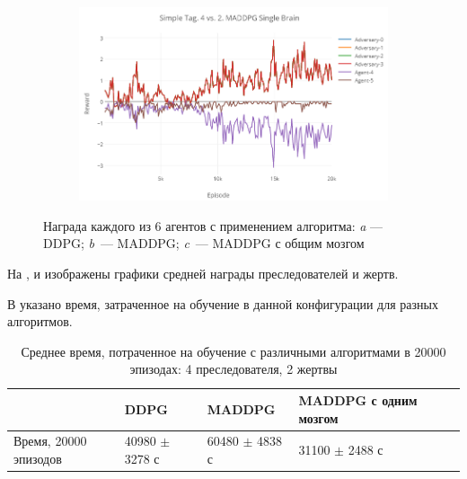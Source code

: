 \begin{figure}[!htbp]
    \begin{subfigure}[t]{\dimexpr.5\linewidth-1.3em\relax}%
        \includegraphics[height=0.20\textheight,valign=t]{my_folder/images/ch5/st-4vs2-maddpg-sb.png}%
    \end{subfigure}
    \captionsetup{justification=centering} %
    \caption{Награда каждого из 6 агентов с применением алгоритма: {\itshape a} --- DDPG; {\itshape b}~--- MADDPG; {\itshape c}~--- MADDPG с общим мозгом}\label{fig:spbpu_main_bld-two-photos}
\end{figure}

На ,  и  изображены графики средней награды преследователей и жертв.

В  указано время, затраченное на обучение в данной конфигурации для разных алгоритмов.

\begin{table}[t!]
    \centering\small
    \caption{Среднее время, потраченное на обучение с различными алгоритмами в 20000 эпизодах: 4 преследователя, 2 жертвы}
    \label{tab-st-4vs2-time}
    \begin{tabular}{|l|l|l|l|l|l|}
        \hline
        & DDPG        & MADDPG      & MADDPG с одним мозгом \\
        \hline
        Время, 20000 эпизодов & 40980 $\pm$ 3278 с & 60480 $\pm$ 4838 с & 31100 $\pm$ 2488 с \\ \hline
    \end{tabular}
    \normalsize%
\end{table}

